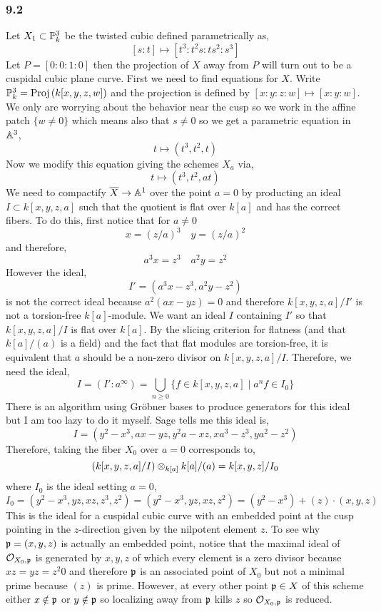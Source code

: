 \documentclass[12pt]{article}
\begin{document}
 
\subsubsection{9.2}

Let $X_1 \subset \P^3_k$ be the twisted cubic defined parametrically as,
\[ [s : t] \mapsto [t^3 : t^2 s : t s^2 : s^3] \]
Let $P = [0 : 0 : 1 : 0]$ then the projection of $X$ away from $P$ will turn out to be a cuspidal cubic plane curve. 
First we need to find equations for $X$. Write $\P^3_k = \Proj{k[x,y,z,w]}$ and the projection is defined by $[x:y:z:w] \mapsto [x:y:w]$. We only are worrying about the behavior near the cusp so we work in the affine patch $\{ w \neq 0 \}$ which means also that $s \neq 0$ so we get a parametric equation in $\A^3$,
\[ t \mapsto (t^3, t^2, t) \]
Now we modify this equation giving the schemes $X_a$ via,
\[ t \mapsto (t^3, t^2, at) \]
We need to compactify $\overline{X} \to \A^1$ over the point $a = 0$ by producting an ideal $I \subset k[x,y,z,a]$ such that the quotient is flat over $k[a]$ and has the correct fibers. To do this, first notice that for $a \neq 0$
\[ x = (z/a)^3 \quad y = (z/a)^2 \]
and therefore,
\[ a^3 x = z^3 \quad a^2 y = z^2 \] 
However the ideal,
\[ I' = (a^3 x - z^3, a^2 y - z^2) \]
is not the correct ideal because $a^2 (ax - yz) = 0$ and therefore $k[x,y,z,a]/I'$ is not a torsion-free $k[a]$-module.
We want an ideal $I$ containing $I'$ so that $k[x,y,z,a]/I$ is flat over $k[a]$. By the slicing criterion for flatness (and that $k[a]/(a)$ is a field) and the fact that flat modules are torsion-free, it is equivalent that $a$ should be a non-zero divisor on $k[x,y,z,a]/I$.
 Therefore, we need the ideal,
\[ I = (I' : a^\infty) = \bigcup_{n \ge 0} \{ f \in k[x,y,z,a] \mid a^n f \in I_0 \} \]
There is an algorithm using Gr\"{o}bner bases to produce generators for this ideal but I am too lazy to do it myself. Sage tells me this ideal is,
\[ I = (y^2 - x^3, ax - yz, y^2 a - xz, x a^3 - z^3, y a^2 - z^2) \]
Therefore, taking the fiber $X_0$ over $a = 0$ corresponds to,
\[ (k[x, y, z, a]/I) \ot_{k[a]} k[a]/(a) = k[x,y,z]/I_0 \]
where $I_0$ is the ideal setting $a = 0$,
\[ I_0 = (y^2 - x^3, yz, xz, z^3, z^2) = (y^2 - x^3, yz, xz, z^2) = (y^2 - x^3) + (z) \cdot (x,y,z) \]
This is the ideal for a cuspidal cubic curve with an embedded point at the cusp pointing in the $z$-direction given by the nilpotent element $z$. To see why $\p = (x,y,z)$ is actually an embedded point, notice that the maximal ideal of $\stalk{X_0}{\p}$ is generated by $x,y,z$ of which every element is a zero divisor because $xz = yz = z^2 0$ and therefore $\p$ is an associated point of $X_0$ but not a minimal prime because $(z)$ is prime. However, at every other point $\p \in X$ of this scheme either $x \notin \p$ or $y \notin \p$ so localizing away from $\p$ kills $z$ so $\stalk{X_0}{\p}$ is reduced. 
\end{document}
